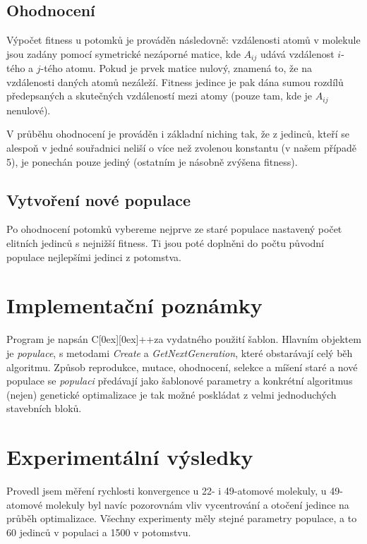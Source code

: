 \documentclass[journal]{IEEEtrancz}
\newcommand{\Cpp}{C\raisebox{0.15ex}[0ex][0ex]{++}}
\begin{document}
\subsection{Ohodnocení}
Výpočet fitness u potomků je prováděn následovně: vzdálenosti atomů v molekule jsou zadány pomocí symetrické nezáporné matice, kde $A_{ij}$ udává vzdálenost $i$-tého a $j$-tého atomu. Pokud je prvek matice nulový, znamená to, že na vzdálenosti daných atomů nezáleží. Fitness jedince je pak dána sumou rozdílů předepsaných a skutečných vzdáleností mezi atomy (pouze tam, kde je $A_{ij}$ nenulové).

V průběhu ohodnocení je prováděn i základní niching tak, že z jedinců, kteří se alespoň v jedné souřadnici neliší o více než zvolenou konstantu (v našem případě 5), je ponechán pouze jediný (ostatním je násobně zvýšena fitness).

\subsection{Vytvoření nové populace}
Po ohodnocení potomků vybereme nejprve ze staré populace nastavený počet elitních jedinců s nejnižší fitness. Ti jsou poté doplněni do počtu původní populace nejlepšími jedinci z potomstva.

\section{Implementační poznámky}
Program je napsán \Cpp  za vydatného použití šablon. Hlavním objektem je \textit{populace}, s metodami \textit{Create} a \textit{GetNextGeneration}, které obstarávají celý běh algoritmu. Způsob reprodukce, mutace, ohodnocení, selekce a míšení staré a nové populace se \textit{populaci} předávají jako šablonové parametry a konkrétní algoritmus (nejen) genetické optimalizace je tak možné poskládat z velmi jednoduchých stavebních bloků.

\section{Experimentální výsledky}
Provedl jsem měření rychlosti konvergence u 22- i 49-atomové molekuly, u 49-atomové molekuly byl navíc pozorovnám vliv vycentrování a otočení jedince na průběh optimalizace. Všechny experimenty měly stejné parametry populace, a to 60 jedinců v populaci a 1500 v potomstvu.
\end{document}
